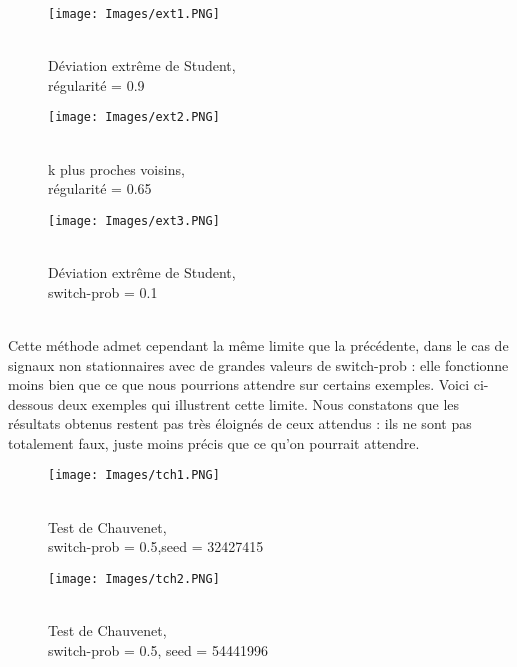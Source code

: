 \documentclass[a4paper,12pt]{article} %
\begin{document}
                    \begin{figure}[H] %
                    \texttt{[image: Images/ext1.PNG]} %
                    \caption{\\Déviation extrême de Student,\\ régularité = 0.9} %
                    \label{m15} %
                    \endminipage
                    \hfill
                    \endminipage
                    \texttt{[image: Images/ext2.PNG]}
                    \caption{\\k plus proches voisins,\\ régularité = 0.65}
                    \label{m5}
                    \endminipage
                    \hfill
                    \endminipage
                    \texttt{[image: Images/ext3.PNG]}  
                    
                    \caption{\\Déviation extrême de Student,\\ switch-prob = 0.1}
                    
                    \label{m35}
                    \endminipage
                    \end{figure}
                    \\
                    Cette méthode admet cependant la même limite que la précédente, dans le cas de signaux non stationnaires avec de grandes valeurs de switch-prob : elle fonctionne moins bien que ce que nous pourrions attendre sur certains exemples. Voici ci-dessous deux exemples qui illustrent cette limite. Nous constatons que les résultats obtenus restent pas très éloignés de ceux attendus : ils ne sont pas totalement faux, juste moins précis que ce qu'on pourrait attendre.
                    \begin{figure}[H] %
                    \texttt{[image: Images/tch1.PNG]} %
                    \caption{\\Test de Chauvenet,\\switch-prob = 0.5,seed = 32427415} %
                    \label{m15} %
                    \endminipage
                    \texttt{[image: Images/tch2.PNG]}  
                    \caption{\\Test de Chauvenet,\\switch-prob = 0.5, seed = 54441996}
                    \label{m5}
                    \endminipage
                    \end{figure}
                
\end{document}
